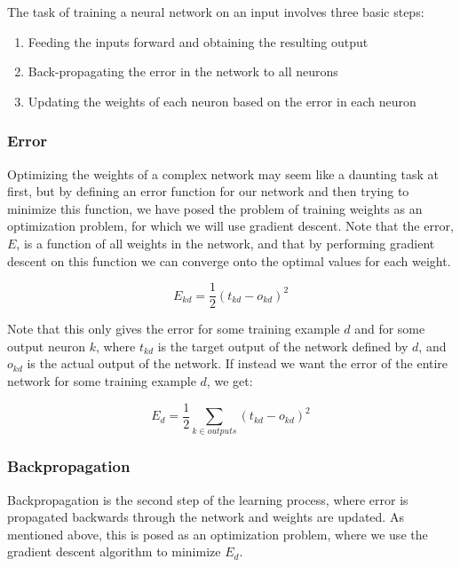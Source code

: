 \documentclass[a4paper, 11pt]{article} %
\begin{document}
The task of training a neural network on an input involves three basic steps:

\begin{enumerate}
	\item{Feeding the inputs forward and obtaining the resulting output}
	\item{Back-propagating the error in the network to all neurons}
	\item{Updating the weights of each neuron based on the error in each neuron}
\end{enumerate}

\subsubsection*{Error}

Optimizing the weights of a complex network may seem like a daunting task at first, but by defining an error function for our network and then trying to minimize this function, we have posed the problem of training weights as an optimization problem, for which we will use gradient descent.  Note that the error, $E$, is a function of all weights in the network, and that by performing gradient descent on this function we can converge onto the optimal values for each weight.

\begin{equation}
E_{kd} = \frac{1}{2} (t_{kd} - o_{kd})^2
\end{equation}

Note that this only gives the error for some training example $d$ and for some output neuron $k$, where $t_{kd}$ is the target output of the network defined by $d$, and $o_{kd}$ is the actual output of the network.  If instead we want the error of the entire network for some training example $d$, we get:

\begin{equation}
E_{d} = \frac{1}{2} \sum_{k \in outputs} (t_{kd} - o_{kd})^2
\end{equation}

\subsubsection*{Backpropagation}

Backpropagation is the second step of the learning process, where error is propagated backwards through the network and weights are updated.  As mentioned above, this is posed as an optimization problem, where we use the gradient descent algorithm to minimize $E_d$.
\end{document}
